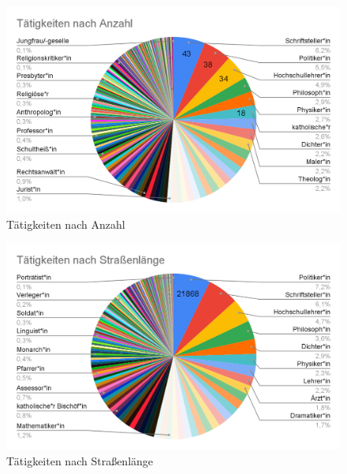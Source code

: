 \documentclass[ngerman,twocolumn,showpacs,%
  nofootinbib,aps,superscriptaddress,%
  eqsecnum,prd,notitlepage,showkeys,10pt,report]{revtex4-2}
\begin{document}
\begin{figure}
\centering
\includegraphics[width=1\linewidth]{5.png}
\caption{Tätigkeiten nach Anzahl}
\label{fig:JobsByCount}
\end{figure}
\begin{figure}
\centering
\includegraphics[width=1\linewidth]{6.png}
\caption{Tätigkeiten nach Straßenlänge}
\label{fig:JobsByLength}
\end{figure}
\end{document}
